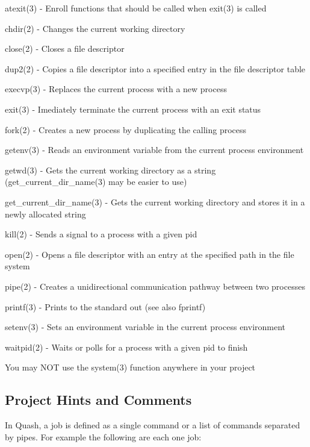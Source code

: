 \begin{DoxyItemize}
\item atexit(3) -\/ Enroll functions that should be called when exit(3) is called
\item chdir(2) -\/ Changes the current working directory
\item close(2) -\/ Closes a file descriptor
\item dup2(2) -\/ Copies a file descriptor into a specified entry in the file descriptor table
\item execvp(3) -\/ Replaces the current process with a new process
\item exit(3) -\/ Imediately terminate the current process with an exit status
\item fork(2) -\/ Creates a new process by duplicating the calling process
\item getenv(3) -\/ Reads an environment variable from the current process environment
\item getwd(3) -\/ Gets the current working directory as a string (get\+\_\+current\+\_\+dir\+\_\+name(3) may be easier to use)
\item get\+\_\+current\+\_\+dir\+\_\+name(3) -\/ Gets the current working directory and stores it in a newly allocated string
\item kill(2) -\/ Sends a signal to a process with a given pid
\item open(2) -\/ Opens a file descriptor with an entry at the specified path in the file system
\item pipe(2) -\/ Creates a unidirectional communication pathway between two processes
\item printf(3) -\/ Prints to the standard out (see also fprintf)
\item setenv(3) -\/ Sets an environment variable in the current process environment
\item waitpid(2) -\/ Waits or polls for a process with a given pid to finish
\end{DoxyItemize}

You may N\+OT use the system(3) function anywhere in your project

\subsection*{Project Hints and Comments}

In Quash, a job is defined as a single command or a list of commands separated by pipes. For example the following are each one job\+:


